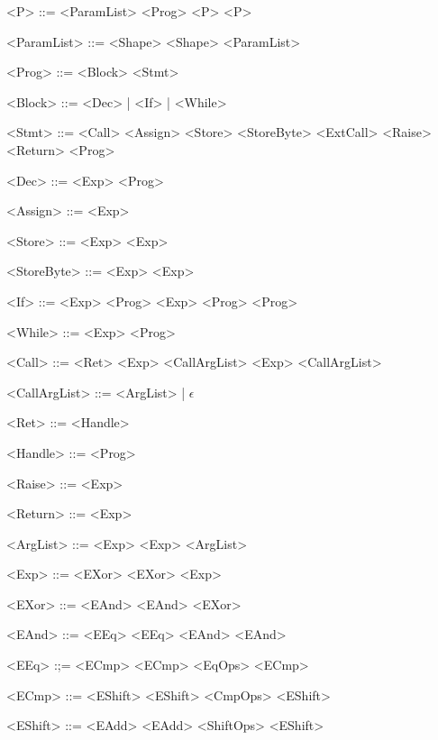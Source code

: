 \documentclass[12pt,a4paper]{report}
\begin{document}
\begin{grammar}
  <P> ::=   \lit{(} <ParamList> \lit{)} \lit{\{} <Prog> \lit{\}}
  \alt <P> <P>

  <ParamList> ::= <Shape> 
  \alt <Shape>  \lit{,} <ParamList>

  <Prog> ::= <Block>
  \alt <Stmt> \lit{;}

  <Block> ::= <Dec> | <If> | <While>

  <Stmt> ::= 
  \alt <Call>
  \alt <Assign>
  \alt <Store>
  \alt <StoreByte>
  \alt {}
  \alt {}
  \alt <ExtCall>
  \alt <Raise>
  \alt <Return>
  \alt {}
  \alt \lit{\{} <Prog> \lit{\}}

  <Dec> ::=   \lit{=} <Exp> \lit{;} <Prog>

  <Assign> ::=  \lit{=} <Exp>

  <Store> ::=  <Exp> \lit{,} <Exp>

  <StoreByte> ::=  <Exp> \lit{,} <Exp>

  <If> ::=  <Exp> \lit{\{} <Prog> \lit{\}}
  \alt {} <Exp> \lit{\{} <Prog> \lit{\}}  \lit{\{} <Prog> \lit{\}}

  <While> ::=  <Exp> \lit{\{} <Prog> \lit{\}}

  <Call> ::= <Ret> <Exp> \lit{(} <CallArgList> \lit{)}
  \alt <Exp> \lit{(} <CallArgList> \lit{)}

  <CallArgList> ::= <ArgList> | $\epsilon$

  <Ret> ::=  \lit{=} <Handle>
  \alt {} \lit{=}

  <Handle> ::=     \lit{=>} <Prog> 

  <Raise> ::=   <Exp>

  <Return> ::=  <Exp>

  <ArgList> ::= <Exp>
  \alt <Exp> \lit{,} <ArgList>

  <Exp> ::= <EXor>
  \alt <EXor> \lit{|} <Exp>

  <EXor> ::= <EAnd>
  \alt <EAnd> \lit{\^{}} <EXor>

  <EAnd> ::= <EEq>
  \alt <EEq> \lit{\&{}} <EAnd> <EAnd>

  <EEq> :;= <ECmp>
  \alt <ECmp> <EqOps> <ECmp>

  <ECmp> ::= <EShift>
  \alt <EShift> <CmpOps> <EShift>

  <EShift> ::= <EAdd>
  \alt <EAdd> <ShiftOps>  <EShift>


\end{grammar}
\end{document}
